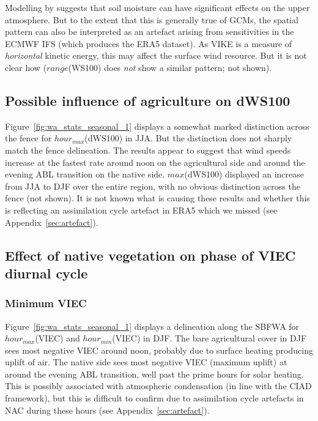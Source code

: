 Modelling by \citet{martius2021} suggests that soil moisture can have significant effects on the upper atmosphere. But to the extent that this is generally true of \acp{GCM}, the spatial pattern can also be interpreted as an artefact arising from sensitivities in the \ac{ECMWF} \ac{IFS} (which produces the \ac{ERA5} dataset). As \ac{VIKE} is a measure of \textit{horizontal} kinetic energy, this may affect the surface wind resource. But it is not clear how ($range$(\acs{WS100}) does \textit{not} show a similar pattern; not shown).

\subsection{Possible influence of agriculture on dWS100}

Figure~\ref{fig:wa_stats_seasonal_1} displays a somewhat marked distinction across the fence for $hour_{max}$(\acs{dWS100}) in \ac{JJA}. But the distinction does not sharply match the fence delineation. The results appear to suggest that wind speeds increase at the fastest rate around noon on the agricultural side and around the evening \ac{ABL} transition on the native side. $max$(\acs{dWS100}) displayed an increase from \ac{JJA} to \ac{DJF} over the entire region, with no obvious distinction across the fence (not shown). It is not known what is causing these results and whether this is reflecting an assimilation cycle artefact in \ac{ERA5} which we missed (see Appendix~\ref{sec:artefact}).

\subsection[Effect of native vegetation on VIEC diurnal phase]{Effect of native vegetation on phase of VIEC diurnal cycle}

\subsubsection{Minimum VIEC}

Figure~\ref{fig:wa_stats_seasonal_1} displays a delineation along the \ac{SBFWA} for $hour_{max}$(\acs{VIEC}) and $hour_{min}$(\acs{VIEC}) in \ac{DJF}. The bare agricultural cover in \ac{DJF} sees most negative \ac{VIEC} around noon, probably due to surface heating producing uplift of air. The native side sees most negative \ac{VIEC} (maximum uplift) at around the evening \ac{ABL} transition, well past the prime hours for solar heating. This is possibly associated with atmospheric condensation (in line with the \ac{CIAD} framework), but this is difficult to confirm due to assimilation cycle artefacts in \ac{NAC} during these hours (see Appendix~\ref{sec:artefact}).


